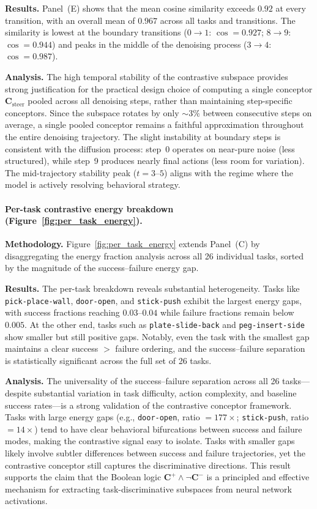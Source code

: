 \textbf{Results.}
Panel~(E) shows that the mean cosine similarity exceeds $0.92$ at every transition, with an overall mean of $0.967$ across all tasks and transitions. The similarity is lowest at the boundary transitions ($0 \to 1$: $\cos = 0.927$; $8 \to 9$: $\cos = 0.944$) and peaks in the middle of the denoising process ($3 \to 4$: $\cos = 0.987$).

\textbf{Analysis.}
The high temporal stability of the contrastive subspace provides strong justification for the practical design choice of computing a single conceptor $\mathbf{C}_{\mathrm{steer}}$ pooled across all denoising steps, rather than maintaining step-specific conceptors. Since the subspace rotates by only ${\sim}3\%$ between consecutive steps on average, a single pooled conceptor remains a faithful approximation throughout the entire denoising trajectory. The slight instability at boundary steps is consistent with the diffusion process: step~0 operates on near-pure noise (less structured), while step~9 produces nearly final actions (less room for variation). The mid-trajectory stability peak ($t = 3$--$5$) aligns with the regime where the model is actively resolving behavioral strategy.

\paragraph{Per-task contrastive energy breakdown (Figure~\ref{fig:per_task_energy}).}

\textbf{Methodology.}
Figure~\ref{fig:per_task_energy} extends Panel~(C) by disaggregating the energy fraction analysis across all 26 individual tasks, sorted by the magnitude of the success--failure energy gap.

\textbf{Results.}
The per-task breakdown reveals substantial heterogeneity. Tasks like \texttt{pick-place-wall}, \texttt{door-open}, and \texttt{stick-push} exhibit the largest energy gaps, with success fractions reaching $0.03$--$0.04$ while failure fractions remain below $0.005$. At the other end, tasks such as \texttt{plate-slide-back} and \texttt{peg-insert-side} show smaller but still positive gaps. Notably, even the task with the smallest gap maintains a clear success $>$ failure ordering, and the success--failure separation is statistically significant across the full set of 26 tasks.

\textbf{Analysis.}
The universality of the success--failure separation across all 26 tasks---despite substantial variation in task difficulty, action complexity, and baseline success rates---is a strong validation of the contrastive conceptor framework. Tasks with large energy gaps (e.g., \texttt{door-open}, ratio $= 177\times$; \texttt{stick-push}, ratio $= 14\times$) tend to have clear behavioral bifurcations between success and failure modes, making the contrastive signal easy to isolate. Tasks with smaller gaps likely involve subtler differences between success and failure trajectories, yet the contrastive conceptor still captures the discriminative directions. This result supports the claim that the Boolean logic $\mathbf{C}^+ \wedge \lnot \mathbf{C}^-$ is a principled and effective mechanism for extracting task-discriminative subspaces from neural network activations.
